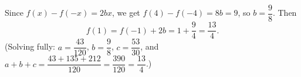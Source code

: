 Since $f(x)-f(-x)=2bx$, we get $f(4)-f(-4)=8b=9$, so $b=\dfrac{9}{8}$. Then
\[f(1)=f(-1)+2b=1+\dfrac{9}{4}=\boxed{\dfrac{13}{4}}.\]
(Solving fully: $a=\dfrac{43}{120}$, $b=\dfrac{9}{8}$, $c=\dfrac{53}{30}$, and $a+b+c=\dfrac{43+135+212}{120}=\dfrac{390}{120}=\dfrac{13}{4}$.)
